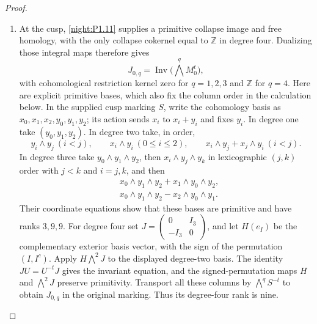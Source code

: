 \begin{proof}
\begin{enumerate}[label=\arabic*.]
We fix its column basis as follows.  Exterior coordinates are in
increasing lexicographic order, with indices starting at zero.
For each signed-permutation orbit, start at its least coordinate
and sum its successive signed images until it returns there.
A positive orbit of length $l$ gives a primitive invariant column;
the norm image has the column $m_i/l$ times that column.
A negative orbit has zero invariant lattice and one $\mathbb Z/2$
in its coinvariant group.  Indeed the successive relations identify
all its coordinates with signed copies of the first, and the last
relation is twice that first coordinate.  Order the positive orbits
by their least coordinates, with vertical columns before horizontal
columns.  For $D_1$ there is no torsion in vertical degrees $1$ through
$4$.  For $D_2$ there is one negative orbit in each such degree; the
positive-orbit counts are $1,2,2,1$.

\item At the cusp, \cref{night:P1.11} supplies a primitive collapse
image and free homology, with the only collapse cokernel equal to
$\mathbb Z$ in degree four.  Dualizing those integral maps therefore
gives
\[
 J_{0,q}=\operatorname{Inv}\bigl(\bigwedge^q M_0^t\bigr),
\]
with cohomological restriction kernel zero for $q=1,2,3$ and
$\mathbb Z$ for $q=4$.
Here are explicit primitive bases, which also fix the column order
in the calculation below.  In the supplied cusp marking $S$, write
the cohomology basis as $x_0,x_1,x_2,y_0,y_1,y_2$; its action sends
$x_i$ to $x_i+y_i$ and fixes $y_i$.
In degree one take $(y_0,y_1,y_2)$.  In degree two take, in order,
\[
 y_i\wedge y_j\ (i<j),\qquad
 x_i\wedge y_i\ (0\le i\le2),\qquad
 x_i\wedge y_j+x_j\wedge y_i\ (i<j).
\]
In degree three take $y_0\wedge y_1\wedge y_2$, then
$x_i\wedge y_j\wedge y_k$ in lexicographic $(j,k)$ order with
$j<k$ and $i=j,k$, and then
\[
\begin{split}
 &x_0\wedge y_1\wedge y_2+x_1\wedge y_0\wedge y_2,\\
 &x_0\wedge y_1\wedge y_2-x_2\wedge y_0\wedge y_1.
\end{split}
\]
Their coordinate equations show that these bases are primitive and
have ranks $3,9,9$.  For degree four set
$J=\left(\begin{smallmatrix}0&I_3\\-I_3&0\end{smallmatrix}\right)$,
and let $H(e_I)$ be the complementary exterior basis vector, with
the sign of the permutation $(I,I^c)$.  Apply
$H\bigwedge^2J$ to the displayed degree-two basis.
The identity $JU=U^{-t}J$ gives the invariant equation, and the
signed-permutation maps $H$ and $\bigwedge^2J$ preserve primitivity.
Transport all these columns by $\bigwedge^qS^{-t}$ to obtain
$J_{0,q}$ in the original marking.  Thus its degree-four rank is nine.


\end{enumerate}
\end{proof}
